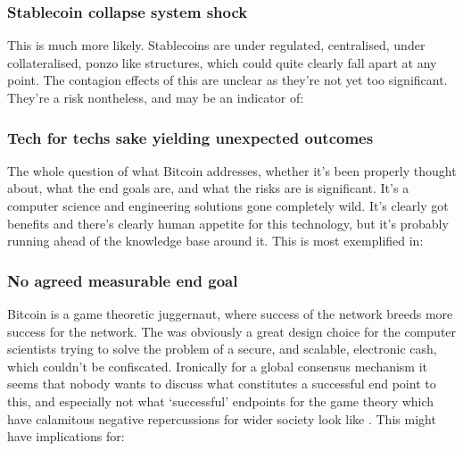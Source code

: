 \begin{itemize}
\subsubsection{Stablecoin collapse system shock}
This is much more likely. Stablecoins are under regulated, centralised, under collateralised, ponzo like structures, which could quite clearly fall apart at any point. The contagion effects of this are unclear as they're not yet too significant. They're a risk nontheless, and may be an indicator of:
\subsubsection{Tech for techs sake yielding unexpected outcomes}
The whole question of what Bitcoin addresses, whether it's been properly thought about, what the end goals are, and what the risks are is significant. It's a computer science and engineering solutions gone completely wild. It's clearly got benefits and there's clearly human appetite for this technology, but it's probably running ahead of the knowledge base around it. This is most exemplified in:
\subsubsection{No agreed measurable end goal}
 Bitcoin is a game theoretic juggernaut, where success of the network breeds more success for the network. The was obviously a great design choice for the computer scientists trying to solve the problem of a secure, and scalable, electronic cash, which couldn't be confiscated. Ironically for a global consensus mechanism it seems that nobody wants to discuss what constitutes a successful end point to this, and especially not what `successful' endpoints for the game theory which have calamitous negative repercussions for wider society look like \cite{warren2023bitcoin}.  This might have implications for:

\end{itemize}
